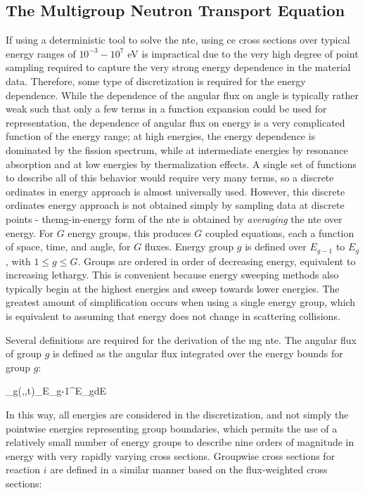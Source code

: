 \subsection{The Multigroup Neutron Transport Equation}
\label{sec:MGNTE}

If using a deterministic tool to solve the \gls{nte}, using \gls{ce} cross sections over typical energy ranges of \(10^{-3}-10^7\) eV is impractical due to the very high degree of point sampling required to capture the very strong energy dependence in the material data. Therefore, some type of discretization is required for the energy dependence. While the dependence of the angular flux on angle is typically rather weak such that only a few terms in a function expansion could be used for representation, the dependence of angular flux on energy is a very complicated function of the energy range; at high energies, the energy dependence is dominated by the fission spectrum, while at intermediate energies by resonance absorption and at low energies by thermalization effects. A single set of functions to describe all of this behavior would require very many terms, so a discrete ordinates in energy approach is almost universally used. However, this discrete ordinates energy approach is not obtained simply by sampling data at discrete points - the\gls{mg}-in-energy form of the \gls{nte} is obtained by {\it averaging} the \gls{nte} over energy. For \(G\) energy groups, this produces \(G\) coupled equations, each a function of space, time, and angle, for \(G\) fluxes. Energy group \(g\) is defined over \(E_{g-1}\) to \(E_{g}\), with \(1\leq g\leq G\). Groups are ordered in order of decreasing energy, equivalent to increasing lethargy. This is convenient because energy sweeping methods also typically begin at the highest energies and sweep towards lower energies. The greatest amount of simplification occurs when using a single energy group, which is equivalent to assuming that energy does not change in scattering collisions.

Several definitions are required for the derivation of the \gls{mg} \gls{nte}. The angular flux of group \(g\) is defined as the angular flux integrated over the energy bounds for group \(g\):

\beq
\label{eq:GroupwiseQuantity}
\psi_g(,\hO,t)\equiv\int_{E_{g-1}}^{E_g}dE\psi\seat
\eeq

In this way, all energies are considered in the discretization, and not simply the pointwise energies representing group boundaries, which permits the use of a relatively small number of energy groups to describe nine orders of magnitude in energy with very rapidly varying cross sections. Groupwise cross sections for reaction \(i\) are defined in a similar manner based on the flux-weighted cross sections:

